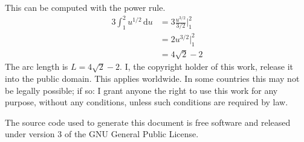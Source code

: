 \documentclass{article}
\begin{document}
        This can be computed with the power rule.
        \begin{subequations}
            \begin{align}
                3\int_{1}^{2}u^{1/2}\,\textrm{d}u
                &=3\frac{u^{3/2}}{3/2}\Big|_{1}^{2}\\
                &=2u^{3/2}\Big|_{1}^{2}\\
                &=4\sqrt{2}-2
            \end{align}
        \end{subequations}
        The arc length is $L=4\sqrt{2}-2$.
        \color{black}
    \fi
    \newpage
    I, the copyright holder of this work, release it into the public domain.
    This applies worldwide. In some countries this may not be legally possible;
    if so: I grant anyone the right to use this work for any purpose, without
    any conditions, unless such conditions are required by law.
    \par\hfill\par
    The source code used to generate this document is free software and released
    under version 3 of the GNU General Public License.
\end{document}
